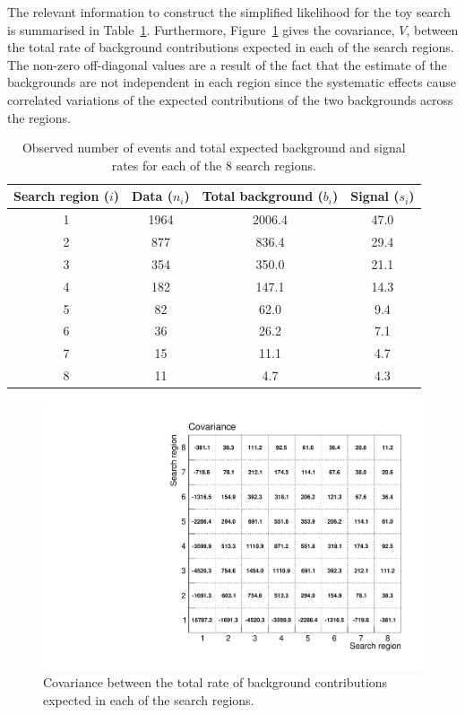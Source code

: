 The relevant information  to construct the simplified likelihood for the toy search is summarised in Table~\ref{tab:toytable}.
Furthermore, Figure~\ref{fig:covariance} gives the covariance, $V$, between the total rate of 
background contributions expected in each of the search regions. The non-zero off-diagonal values are a result of the fact that the estimate of the 
backgrounds are not independent in each region since the systematic effects cause correlated variations of the expected contributions of the two backgrounds 
across the regions. 

\begin{table}[!htb]
\caption{Observed number of events and total expected background and signal rates for each of the 8 search regions.}
 \begin{center}
 \begin{tabular}{|c|c|c|c|}
\hline
Search region ($i$) & Data ($n_{i}$) & Total background ($b_{i}$) & Signal ($s_{i}$) \\
\hline
1 & 1964 & 2006.4 & 47.0 \\
2 & 877 & 836.4 & 29.4 \\
3 & 354 & 350.0 & 21.1 \\
4 & 182 & 147.1 & 14.3 \\
5 & 82  & 62.0  & 9.4 \\
6 & 36  & 26.2  & 7.1 \\
7 & 15  & 11.1  & 4.7 \\
8 & 11  & 4.7   & 4.3 \\
\hline
\end{tabular}
\end{center}
\label{tab:toytable}
\end{table}

\begin{figure}[hbt]
  \begin{center} 
   \includegraphics[width=1.8\cmsFigWidth]{figures/htsearch_covariance.pdf}
   \caption{Covariance between the total rate of background  contributions expected  in each of the  search regions.}
   \label{fig:covariance} 
  \end{center}
\end{figure}

